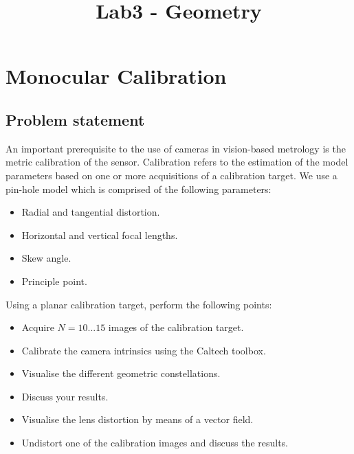 \documentclass[
a4paper,     %
11pt         %
]{scrartcl}  %
\title{Lab3 - Geometry}
\begin{document}

 \maketitle

 \tableofcontents
 \newpage

\section{Monocular Calibration}

\subsection{Problem statement}

An important prerequisite to the use of cameras in vision-based metrology is the metric calibration of the sensor.
Calibration refers to the estimation of the model parameters based on one or more acquisitions of a calibration
target. We use a pin-hole model which is comprised of the following parameters:

\begin{itemize}
 \item Radial and tangential distortion.
 \item Horizontal and vertical focal lengths.
 \item Skew angle.
 \item Principle point.
\end{itemize}

Using a planar calibration target, perform the following points:

\begin{itemize}
 \item Acquire $N = 10...15$ images of the calibration target.
 \item Calibrate the camera intrinsics using the Caltech toolbox.
 \item Visualise the different geometric constellations.
 \item Discuss your results.
 \item Visualise the lens distortion by means of a vector field.
 \item Undistort one of the calibration images and discuss the results.
\end{itemize}
\end{document}
